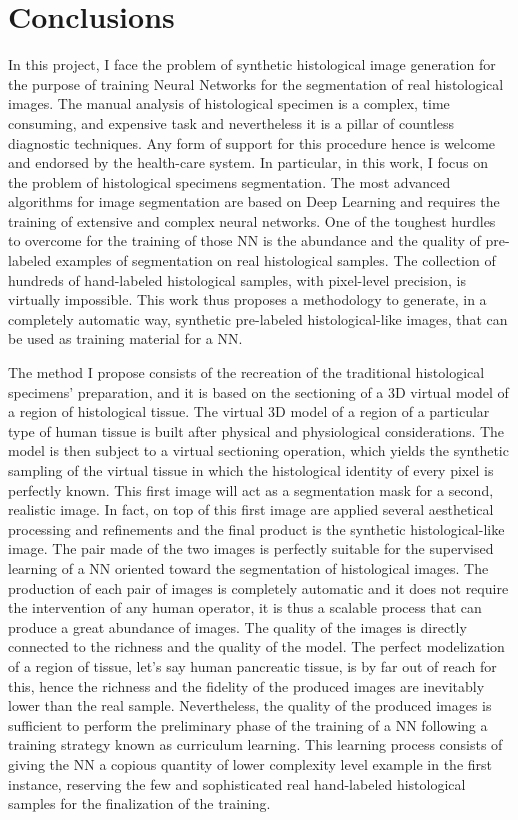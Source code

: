 \chapter*{Conclusions}
\label{chap:concl}

In this project, I face the problem of synthetic histological image generation for the purpose of training Neural Networks for the segmentation of real histological images. The manual analysis of histological specimen is a complex, time consuming, and expensive task and nevertheless it is a pillar of countless diagnostic techniques. Any form of support for this procedure hence is welcome and endorsed by the health-care system. In particular, in this work, I focus on the problem of histological specimens segmentation. The most advanced algorithms for image segmentation are based on Deep Learning and requires the training of extensive and complex neural networks. One of the toughest hurdles to overcome for the training of those NN is the abundance and the quality of pre-labeled examples of segmentation on real histological samples. The collection of hundreds of hand-labeled histological samples, with pixel-level precision, is virtually impossible. This work thus proposes a methodology to generate, in a completely automatic way, synthetic pre-labeled histological-like images, that can be used as training material for a NN.

The method I propose consists of the recreation of the traditional histological specimens' preparation, and it is based on the sectioning of a 3D virtual model of a region of histological tissue. The virtual 3D model of a region of a particular type of human tissue is built after physical and physiological considerations. The model is then subject to a virtual sectioning operation, which yields the synthetic sampling of the virtual tissue in which the histological identity of every pixel is perfectly known. This first image will act as a segmentation mask for a second, realistic image. In fact, on top of this first image are applied several aesthetical processing and refinements and the final product is the synthetic histological-like image. The pair made of the two images is perfectly suitable for the supervised learning of a NN oriented toward the segmentation of histological images. The production of each pair of images is completely automatic and it does not require the intervention of any human operator, it is thus a scalable process that can produce a great abundance of images. The quality of the images is directly connected to the richness and the quality of the model. The perfect modelization of a region of tissue, let's say human pancreatic tissue, is by far out of reach for this, hence the richness and the fidelity of the produced images are inevitably lower than the real sample. Nevertheless, the quality of the produced images is sufficient to perform the preliminary phase of the training of a NN following a training strategy known as curriculum learning. This learning process consists of giving the NN a copious quantity of lower complexity level example in the first instance, reserving the few and sophisticated real hand-labeled histological samples for the finalization of the training.

